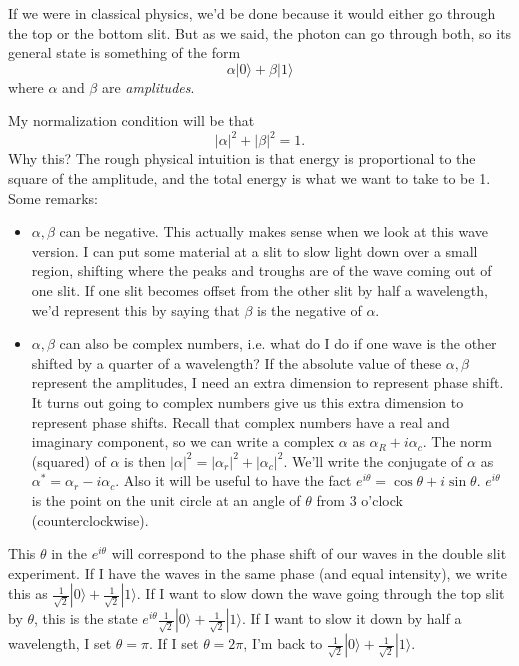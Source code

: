 If we were in classical physics, we'd be done because it would either go through the top or the bottom slit. But as we said, the photon can go through both, so its general state is something of the form
\[ \alpha | 0 \rangle + \beta | 1 \rangle \]
where $\alpha$ and $\beta$ are \emph{amplitudes}.

My normalization condition will be that 
\[ |\alpha|^2 + |\beta|^2 = 1.\]
Why this? The rough physical intuition is that energy is proportional to the square of the amplitude, and the total energy is what we want to take to be 1.
Some remarks:
\begin{itemize}
\item $\alpha,\beta$ can be negative. This actually makes sense when we look at this wave version. I can put some material at a slit to slow light down over a small region, shifting where the peaks and troughs are of the wave coming out of one slit. If one slit becomes offset from the other slit by half a wavelength, we'd represent this by saying that $\beta$ is the negative of $\alpha$. 
\item $\alpha,\beta$ can also be complex numbers, i.e. what do I do if one wave is the other shifted by a quarter of a wavelength? If the absolute value of these $\alpha,\beta$ represent the amplitudes, I need an extra dimension to represent phase shift. It turns out going to complex numbers give us this extra dimension to represent phase shifts. Recall that complex numbers have a real and imaginary component, so we can write a complex $\alpha$ as $\alpha_R + i \alpha_c$. The norm (squared) of $\alpha$ is then $|\alpha|^2 = |\alpha_r|^2 + |\alpha_c|^2$. We'll write the conjugate of $\alpha$ as $\alpha^* = \alpha_r - i\alpha_c$. Also it will be useful to have the fact $e^{i\theta} = \cos \theta + i \sin \theta$. $e^{i\theta}$ is the point on the unit circle at an angle of $\theta$ from 3 o'clock (counterclockwise). 
\end{itemize}
This $\theta$ in the $e^{i\theta}$ will correspond to the phase shift of our waves in the double slit experiment. If I have the waves in the same phase (and equal intensity), we write this as $\frac{1}{\sqrt{2}} | 0 \rangle + \frac{1}{\sqrt{2}} | 1\rangle$. If I want to slow down the wave going through the top slit by $\theta$, this is the state $e^{i\theta} \frac{1}{\sqrt{2}} | 0 \rangle + \frac{1}{\sqrt{2}} | 1\rangle$. If I want to slow it down by half a wavelength, I set $\theta = \pi$. If I set $\theta = 2\pi$, I'm back to $\frac{1}{\sqrt{2}} | 0 \rangle + \frac{1}{\sqrt{2}} | 1\rangle$.

